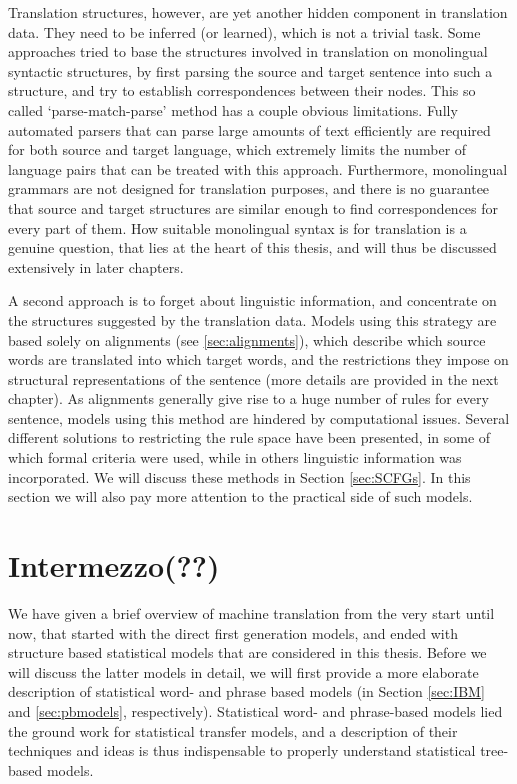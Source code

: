 \documentclass{report}
\theoremstyle{definition}
\theoremstyle{plain}
\begin{document}
Translation structures, however, are yet another hidden component in translation data. They need to be inferred (or learned), which is not a trivial task. Some approaches tried to base the structures involved in translation on monolingual syntactic structures, by first parsing the source and target sentence into such a structure, and try to establish correspondences between their nodes. This so called `parse-match-parse' method has a couple obvious limitations. Fully automated parsers that can parse large amounts of text efficiently are required for both source and target language, which extremely limits the number of language pairs that can be treated with this approach. Furthermore, monolingual grammars are not designed for translation purposes, and there is no guarantee that source and target structures are similar enough to find correspondences for every part of them. How suitable monolingual syntax is for translation is a genuine question, that lies at the heart of this thesis, and will thus be discussed extensively in later chapters.

A second approach is to forget about linguistic information, and concentrate on the structures suggested by the translation data. Models using this strategy are based solely on alignments (see \ref{sec:alignments}), which describe which source words are translated into which target words, and the restrictions they impose on structural representations of the sentence (more details are provided in the next chapter). As alignments generally give rise to a huge number of rules for every sentence, models using this method are hindered by computational issues. Several different solutions to restricting the rule space have been presented, in some of which formal criteria were used, while in others linguistic information was incorporated. We will discuss these methods in Section \ref{sec:SCFGs}. In this section we will also pay more attention to the practical side of such models.

\section*{Intermezzo(??)}
We have given a brief overview of machine translation from the very start until now, that started with the direct first generation models, and ended with structure based statistical models that are considered in this thesis. Before we will discuss the latter models in detail, we will first provide a more elaborate description of statistical word- and phrase based models (in Section \ref{sec:IBM} and \ref{sec:pbmodels}, respectively). Statistical word- and phrase-based models lied the ground work for statistical transfer models, and a description of their techniques and ideas is thus indispensable to properly understand statistical tree-based models.
\end{document}
